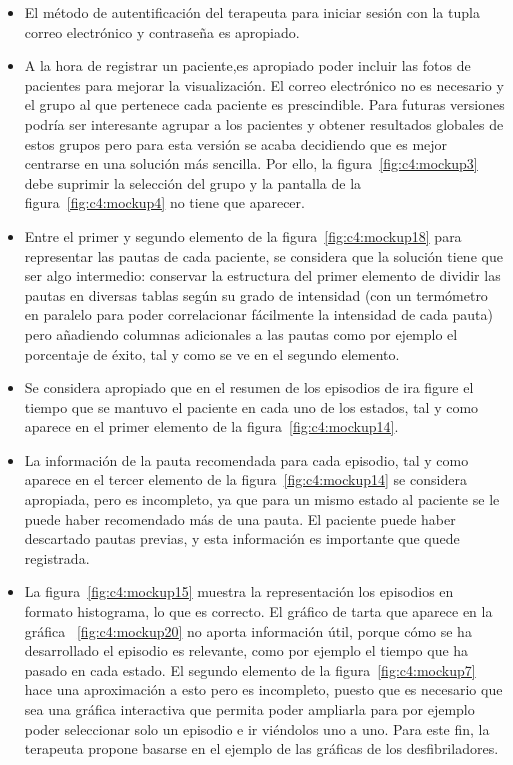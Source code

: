 \begin{itemize}
    \item El método de autentificación del terapeuta para iniciar sesión con la tupla correo electrónico y contraseña es apropiado.
    \item A la hora de registrar un paciente,es apropiado poder incluir las fotos de pacientes para mejorar la visualización. El correo electrónico no es necesario y el grupo al que pertenece cada paciente es prescindible. Para futuras versiones podría ser interesante agrupar a los pacientes y obtener resultados globales de estos grupos pero para esta versión se acaba decidiendo que es mejor centrarse en una solución más sencilla. Por ello, la figura~\ref{fig:c4:mockup3} debe suprimir la selección del grupo y la pantalla de la figura~\ref{fig:c4:mockup4} no tiene que aparecer.
    \item Entre el primer y segundo elemento de la figura~\ref{fig:c4:mockup18} para representar las pautas de cada paciente, se considera que la solución tiene que ser algo intermedio: conservar la estructura del primer elemento de dividir las pautas en diversas tablas según su grado de intensidad (con un termómetro en paralelo para poder correlacionar fácilmente la intensidad de cada pauta) pero añadiendo columnas adicionales a las pautas como por ejemplo el porcentaje de éxito, tal y como se ve en el segundo elemento.
    \item Se considera apropiado que en el resumen de los episodios de ira figure el tiempo que se mantuvo el paciente en cada uno de los estados, tal y como aparece en el primer elemento de la figura~\ref{fig:c4:mockup14}.
    \item La información de la pauta recomendada para cada episodio, tal y como aparece en el tercer elemento de la figura~\ref{fig:c4:mockup14} se considera apropiada, pero es incompleto, ya que para un mismo estado al paciente se le puede haber recomendado más de una pauta. El paciente puede haber descartado pautas previas, y esta información es importante que quede registrada.
    \item La figura~\ref{fig:c4:mockup15} muestra la representación los episodios en formato histograma, lo que es correcto. El gráfico de tarta que aparece en la gráfica ~\ref{fig:c4:mockup20} no aporta información útil, porque cómo se ha desarrollado el episodio es relevante, como por ejemplo el tiempo que ha pasado en cada estado. El segundo elemento de la figura~\ref{fig:c4:mockup7} hace una aproximación a esto pero es incompleto, puesto que es necesario que sea una gráfica interactiva que permita poder ampliarla para por ejemplo poder seleccionar solo un episodio e ir viéndolos uno a uno. Para este fin, la terapeuta propone basarse en el ejemplo de las gráficas de los desfibriladores.

\end{itemize}
